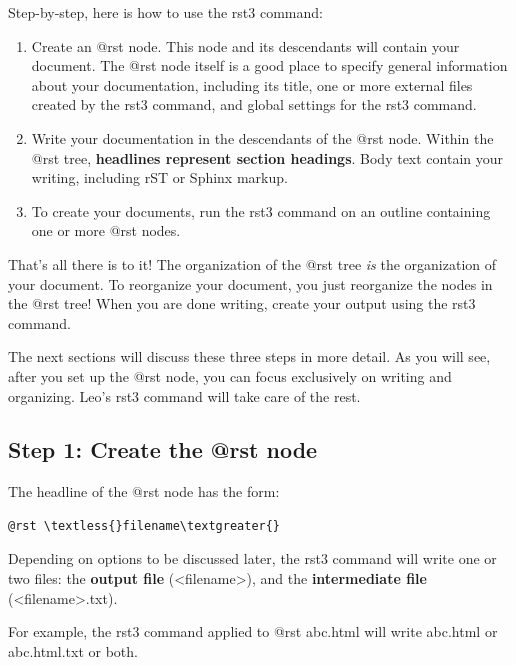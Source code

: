 \documentclass[a4paper,10pt,english]{sphinxmanual}
\begin{document}
Step-by-step, here is how to use the rst3 command:
\begin{enumerate}
\item {} 
Create an @rst node. This node and its descendants will contain your
document. The @rst node itself is a good place to specify general
information about your documentation, including its title, one or more
external files created by the rst3 command, and global settings for the rst3
command.

\item {} 
Write your documentation in the descendants of the @rst node. Within the
@rst tree, \textbf{headlines represent section headings}. Body text contain your
writing, including rST or Sphinx markup.

\item {} 
To create your documents, run the rst3 command on an outline containing one
or more @rst nodes.

\end{enumerate}

That's all there is to it! The organization of the @rst tree \emph{is} the organization
of your document. To reorganize your document, you just reorganize the nodes in
the @rst tree!  When you are done writing, create your output using the rst3 command.

The next sections will discuss these three steps in more detail. As you will
see, after you set up the @rst node, you can focus exclusively on writing and
organizing. Leo's rst3 command will take care of the rest.


\subsection{Step 1: Create the @rst node}
\label{rstplugin3:step-1-create-the-rst-node}
The headline of the @rst node has the form:

\begin{Verbatim}[commandchars=\\\{\}]
@rst \textless{}filename\textgreater{}
\end{Verbatim}

Depending on options to be discussed later, the rst3 command will write one or two files:
the \textbf{output file} (\textless{}filename\textgreater{}), and the \textbf{intermediate file} (\textless{}filename\textgreater{}.txt).

For example, the rst3 command applied to @rst abc.html will write
abc.html or abc.html.txt or both.
\end{document}

